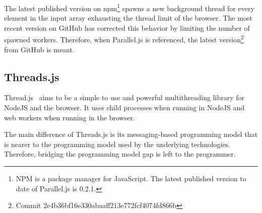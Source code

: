 The latest published version on npm\footnote{NPM is a package manager for JavaScript. The latest published version to date of Parallel.js is 0.2.1.} spawns a new background thread for every element in the input array exhausting the thread limit of the browser. The most recent version on GitHub has corrected this behavior by limiting the number of spawned workers. Therefore, when Parallel.js is referenced, the latest version\footnote{Commit 2e4b36bf16e330abaaff213e772fcf4074fd866b} from GitHub is meant.

\subsection{Threads.js}
Thread.js~\cite{Wermke2016} aims to be a simple to use and powerful multithreading library for NodeJS and the browser. It uses child processes when running in NodeJS and web workers when running in the browser.

The main difference of Threads.js is its messaging-based programming model that is nearer to the programming model used by the underlying technologies. Therefore, bridging the programming model gap is left to the programmer.